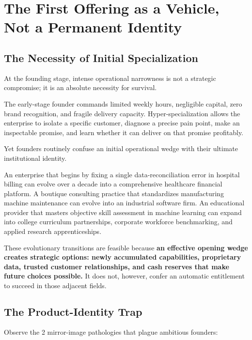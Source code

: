 \section{The First Offering as a Vehicle, Not a Permanent Identity}

\subsection{The Necessity of Initial Specialization}

At the founding stage, intense operational narrowness is not a strategic compromise; it is an absolute necessity for survival.

The early-stage founder commands limited weekly hours, negligible capital, zero brand recognition, and fragile delivery capacity. Hyper-specialization allows the enterprise to isolate a specific customer, diagnose a precise pain point, make an inspectable promise, and learn whether it can deliver on that promise profitably.

Yet founders routinely confuse an initial operational wedge with their ultimate institutional identity.

An enterprise that begins by fixing a single data-reconciliation error in hospital billing can evolve over a decade into a comprehensive healthcare financial platform. A boutique consulting practice that standardizes manufacturing machine maintenance can evolve into an industrial software firm. An educational provider that masters objective skill assessment in machine learning can expand into college curriculum partnerships, corporate workforce benchmarking, and applied research apprenticeships.

These evolutionary transitions are feasible because \textbf{an effective opening wedge creates strategic options: newly accumulated capabilities, proprietary data, trusted customer relationships, and cash reserves that make future choices possible.} It does not, however, confer an automatic entitlement to succeed in those adjacent fields.

\subsection{The Product-Identity Trap}

Observe the 2 mirror-image pathologies that plague ambitious founders:

